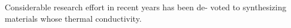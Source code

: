 Considerable research effort in recent years has been de- voted to synthesizing materials whose thermal conductivity.
